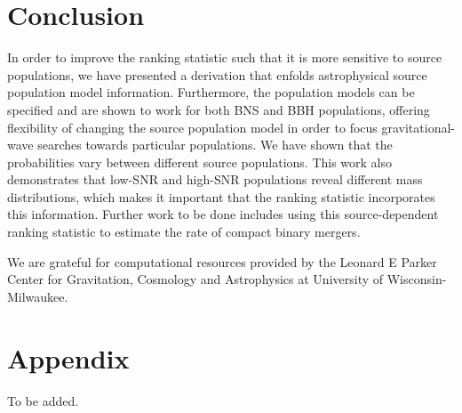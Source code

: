 \documentclass[twocolumn,showpacs,unsortedaddress,superscriptaddress,showkeys,nofootinbib,preprintnumbers,letterpaper]{revtex4-1}
\begin{document}
\section{Conclusion} \label{sec:conclusion}

In order to improve the ranking statistic such that it is more sensitive to source populations, we have presented a derivation that enfolds astrophysical source population model information. Furthermore, the population models can be specified and are shown to work for both BNS and BBH populations, offering flexibility of changing the source population model in order to focus gravitational-wave searches towards particular populations. We have shown that the probabilities vary between different source populations. This work also demonstrates that low-SNR and high-SNR populations reveal different mass distributions, which makes it important that the ranking statistic incorporates this information. Further work to be done includes using this source-dependent ranking statistic to estimate the rate of compact binary mergers.

\acknowledgments

We are grateful for computational resources provided by the Leonard E Parker
Center for Gravitation, Cosmology and Astrophysics at University of
Wisconsin-Milwaukee.

\appendix

\section{Appendix}
\label{appendix2}

To be added.


\end{document}
